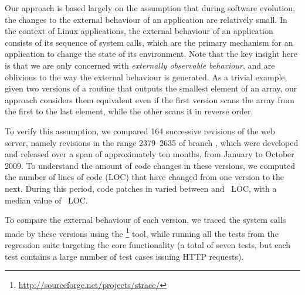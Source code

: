 

Our approach is based largely on the assumption that during software
evolution, the changes to the external behaviour of an application are
relatively small.  In the context of Linux applications, the external
behaviour of an application consists of its sequence of system calls,
which are the primary mechanism for an application to change the state of
its environment.  Note that the key insight here is that we are only
concerned with \textit{externally observable behaviour}, and are
oblivious to the way the external behaviour is generated.  As a trivial
example, given two versions of a routine that outputs the smallest
element of an array, our approach considers them equivalent even if
the first version scans the array from the first to the last element,
while the other scans it in reverse order.

To verify this assumption, we compared 164 successive revisions of the
\lighttpd web server, namely revisions in the range 2379--2635 of
branch , which were developed and released
over a span of approximately ten months, from January to October 2009.
To understand the amount of code changes in these versions, we 
computed the number of lines of code (LOC) that have changed from
one version to the next.  
During this period, code patches in \lighttpd varied between
\lighttpdMinPatch and \lighttpdMaxPatch~LOC, with a median value of 
\lighttpdMedPatch~LOC.


To compare the external behaviour of each version, we traced the system
calls made by these versions using the
\footnote{\url{http://sourceforge.net/projects/strace/}}
tool, while running all the tests from the \lighttpd regression suite
targeting the core functionality (a total of seven tests, but
each test contains a large number of test cases issuing HTTP requests).

